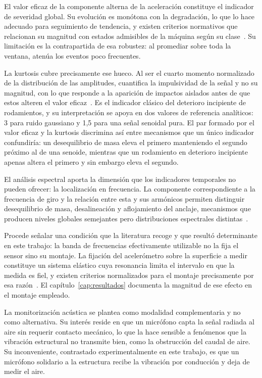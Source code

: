El valor eficaz de la componente alterna de la aceleración constituye el indicador de
severidad global. Su evolución es monótona con la degradación, lo que lo hace adecuado para
seguimiento de tendencia, y existen criterios normativos que relacionan su magnitud con
estados admisibles de la máquina según su clase~\cite{iso20816}. Su limitación es la
contrapartida de esa robustez: al promediar sobre toda la ventana, atenúa los eventos poco
frecuentes.

La kurtosis cubre precisamente ese hueco. Al ser el cuarto momento normalizado de la
distribución de las amplitudes, cuantifica la impulsividad de la señal y no su magnitud, con lo
que responde a la aparición de impactos aislados antes de que estos alteren el valor
eficaz~\cite{randall2011}. Es el indicador clásico del deterioro incipiente de rodamientos, y
su interpretación se apoya en dos valores de referencia analíticos: 3 para ruido gaussiano y
1,5 para una señal senoidal pura. El par formado por el valor eficaz y la kurtosis discrimina
así entre mecanismos que un único indicador confundiría: un desequilibrio de masa eleva el
primero manteniendo el segundo próximo al de una senoide, mientras que un rodamiento en
deterioro incipiente apenas altera el primero y sin embargo eleva el segundo.

El análisis espectral aporta la dimensión que los indicadores temporales no pueden ofrecer: la
localización en frecuencia. La componente correspondiente a la frecuencia de giro y la
relación entre esta y sus armónicos permiten distinguir desequilibrio de masa, desalineación
y aflojamiento del anclaje, mecanismos que producen niveles globales semejantes pero
distribuciones espectrales distintas~\cite{randall2011}.

Procede señalar una condición que la literatura recoge y que resultó determinante en este
trabajo: la banda de frecuencias efectivamente utilizable no la fija el sensor sino su
montaje. La fijación del acelerómetro sobre la superficie a medir constituye un sistema
elástico cuya resonancia limita el intervalo en que la medida es fiel, y existen criterios
normalizados para el montaje precisamente por esa razón~\cite{iso5348}. El
capítulo~\ref{cap:resultados} documenta la magnitud de ese efecto en el montaje empleado.

La monitorización acústica se plantea como modalidad complementaria y no como alternativa. Su
interés reside en que un micrófono capta la señal radiada al aire sin requerir contacto
mecánico, lo que la hace sensible a fenómenos que la vibración estructural no transmite bien,
como la obstrucción del caudal de aire. Su inconveniente, contrastado experimentalmente en
este trabajo, es que un micrófono solidario a la estructura recibe la vibración por conducción
y deja de medir el aire.

